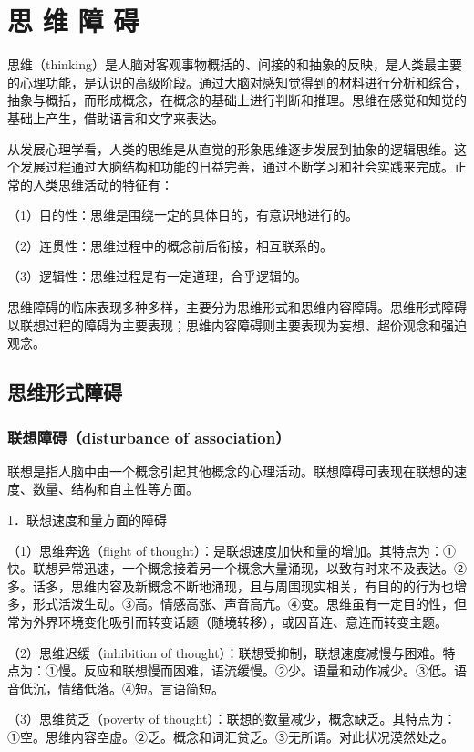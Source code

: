 \section{思 维 障 碍}

思维（thinking）是人脑对客观事物概括的、间接的和抽象的反映，是人类最主要的心理功能，是认识的高级阶段。通过大脑对感知觉得到的材料进行分析和综合，抽象与概括，而形成概念，在概念的基础上进行判断和推理。思维在感觉和知觉的基础上产生，借助语言和文字来表达。

从发展心理学看，人类的思维是从直觉的形象思维逐步发展到抽象的逻辑思维。这个发展过程通过大脑结构和功能的日益完善，通过不断学习和社会实践来完成。正常的人类思维活动的特征有：

（1）目的性：思维是围绕一定的具体目的，有意识地进行的。

（2）连贯性：思维过程中的概念前后衔接，相互联系的。

（3）逻辑性：思维过程是有一定道理，合乎逻辑的。

思维障碍的临床表现多种多样，主要分为思维形式和思维内容障碍。思维形式障碍以联想过程的障碍为主要表现；思维内容障碍则主要表现为妄想、超价观念和强迫观念。

\subsection{思维形式障碍}

\subsubsection{联想障碍（disturbance of association）}

联想是指人脑中由一个概念引起其他概念的心理活动。联想障碍可表现在联想的速度、数量、结构和自主性等方面。

1．联想速度和量方面的障碍

（1）思维奔逸（flight of
thought）：是联想速度加快和量的增加。其特点为：①快。联想异常迅速，一个概念接着另一个概念大量涌现，以致有时来不及表达。②多。话多，思维内容及新概念不断地涌现，且与周围现实相关，有目的的行为也增多，形式活泼生动。③高。情感高涨、声音高亢。④变。思维虽有一定目的性，但常为外界环境变化吸引而转变话题（随境转移），或因音连、意连而转变主题。

（2）思维迟缓（inhibition of
thought）：联想受抑制，联想速度减慢与困难。特点为：①慢。反应和联想慢而困难，语流缓慢。②少。语量和动作减少。③低。语音低沉，情绪低落。④短。言语简短。

（3）思维贫乏（poverty of
thought）：联想的数量减少，概念缺乏。其特点为：①空。思维内容空虚。②乏。概念和词汇贫乏。③无所谓。对此状况漠然处之。

